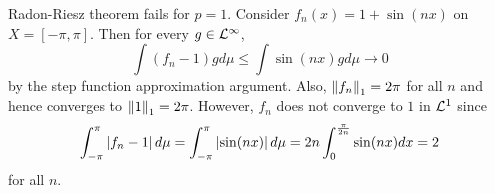 \begin{remark}
    Radon-Riesz theorem fails for $p=1$. Consider $f_n(x) = 1+\sin(nx)$ on $X=[-\pi,\pi]$. 
    Then for every $g\in\mathcal{L}^\infty$, 
    \begin{equation*}
        \int (f_n - 1)gd\mu \leq \int \sin(nx)gd\mu \to 0
    \end{equation*}
    by the step function approximation argument. Also, $\left\lVert {f_n} \right\rVert_1 = 2\pi$ for all $n$ and 
    hence converges to $\left\lVert {1} \right\rVert_1 = 2\pi$. However, $f_n$ does not converge to $1$ in $\mathcal{L}^1$ 
    since 
    \begin{equation*}
        \int_{-\pi}^{\pi} \left\lvert {f_n-1} \right\rvert d\mu = \int_{-\pi}^{\pi} \left\lvert {\sin(nx)} \right\rvert d\mu  
        = 2n\int_{0}^{\frac{\pi}{2n}} \sin(nx)dx = 2
    \end{equation*}
    for all $n$.
\end{remark}
